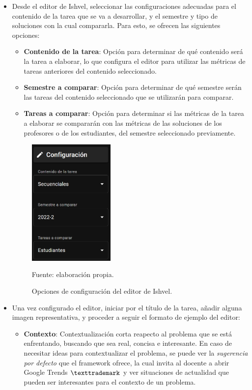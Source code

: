 \documentclass[letterpaper,12pt]{article}
\begin{document}
\begin{itemize}
  \item Desde el editor de Ishvel, seleccionar las configuraciones adecuadas para el contenido de la tarea que se va a desarrollar, y el semestre y tipo de soluciones con la cual compararla. Para esto, se ofrecen las siguientes opciones:
        \begin{itemize}
          \item \textbf{Contenido de la tarea}: Opción para determinar de qué contenido será la tarea a elaborar, lo que configura el editor para utilizar las métricas de tareas anteriores del contenido seleccionado.
          \item \textbf{Semestre a comparar}: Opción para determinar de qué semestre serán las tareas del contenido seleccionado que se utilizarán para comparar.
          \item \textbf{Tareas a comparar}: Opción para determinar si las métricas de la tarea a elaborar se compararán con las métricas de las soluciones de los profesores o de los estudiantes, del semestre seleccionado previamente.
        \end{itemize}
        \begin{figure}[H]
          \centering
          \includegraphics[width=0.4\textwidth]{figures/ishvel1.png}
          \caption{Opciones de configuración del editor de Ishvel.} Fuente: elaboración propia.
          \label{img:ishvel1}
        \end{figure}
  \item Una vez configurado el editor, iniciar por el título de la tarea, añadir alguna imagen representativa, y proceder a seguir el formato de ejemplo del editor:
        \begin{itemize}
          \item \textbf{Contexto}: Contextualización corta reapecto al problema que se está enfrentando, buscando que sea real, concisa e interesante. En caso de necesitar ideas para contextualizar el problema, se puede ver la \textit{sugerencia por defecto} que el framework ofrece, la cual invita al docente a abrir Google Trends $\texttrademark$ y ver situaciones de actualidad que pueden ser interesantes para el contexto de un problema.

\end{itemize}
\end{itemize}
\end{document}
